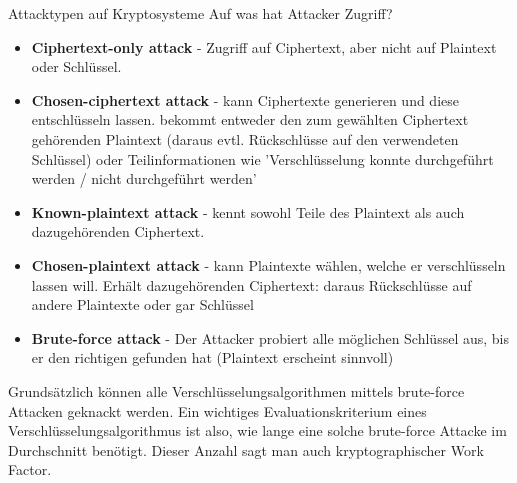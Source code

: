 \begin{KR}{Attacktypen auf Kryptosysteme} Auf was hat Attacker Zugriff?
    \begin{itemize}
        \item \textbf{Ciphertext-only attack} - Zugriff auf Ciphertext, aber nicht auf Plaintext oder Schlüssel.
        \item \textbf{Chosen-ciphertext attack} - kann Ciphertexte generieren und diese entschlüsseln lassen.
        bekommt entweder den zum gewählten Ciphertext gehörenden Plaintext (daraus evtl. Rückschlüsse auf den verwendeten Schlüssel) 
        oder Teilinformationen wie 'Verschlüsselung konnte durchgeführt werden / nicht durchgeführt werden'
        \item \textbf{Known-plaintext attack} - kennt sowohl Teile des Plaintext als auch dazugehörenden Ciphertext.
        \item \textbf{Chosen-plaintext attack} - kann Plaintexte wählen, welche er verschlüsseln lassen will. 
        Erhält dazugehörenden Ciphertext: daraus Rückschlüsse auf andere Plaintexte oder gar Schlüssel 
        \item \textbf{Brute-force attack} - Der Attacker probiert alle möglichen Schlüssel aus, bis er den richtigen gefunden hat (Plaintext erscheint sinnvoll)
    \end{itemize}
\end{KR}

\begin{remark}
    Grundsätzlich können alle Verschlüsselungsalgorithmen mittels brute-force Attacken geknackt werden. 
    Ein wichtiges Evaluationskriterium eines Verschlüsselungsalgorithmus ist also, wie lange eine solche brute-force Attacke im Durchschnitt benötigt. Dieser Anzahl sagt man auch kryptographischer Work Factor.
\end{remark}

